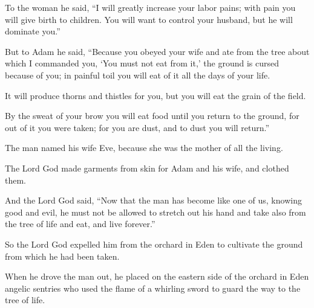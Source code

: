 \begin{scripture}
 To the woman he said, ``I will greatly increase your labor pains; with pain you will give birth to children. You will want to control your husband, but he will dominate you.''
\everypar{}

 But to Adam he said, ``Because you obeyed your wife and ate from the tree about which I commanded you, `You must not eat from it,' the ground is cursed because of you; in painful toil you will eat of it all the days of your life.
\everypar{}

 It will produce thorns and thistles for you, but you will eat the grain of the field.
\everypar{}

 By the sweat of your brow you will eat food until you return to the ground, for out of it you were taken; for you are dust, and to dust you will return.''
\everypar{}

 The man named his wife Eve, because she was the mother of all the living.
 The Lord God made garments from skin for Adam and his wife, and clothed them.
 And the Lord God said, ``Now that the man has become like one of us, knowing good and evil, he must not be allowed to stretch out his hand and take also from the tree of life and eat, and live forever.''
 So the Lord God expelled him from the orchard in Eden to cultivate the ground from which he had been taken.
 When he drove the man out, he placed on the eastern side of the orchard in Eden angelic sentries who used the flame of a whirling sword to guard the way to the tree of life.


\end{scripture}

